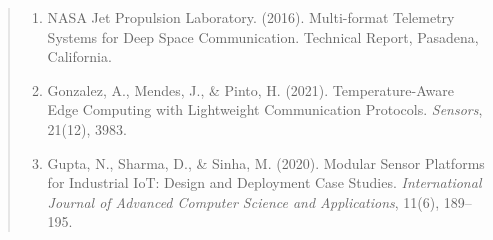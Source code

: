 \documentclass[12pt]{report}
\begin{document}
\begin{quote}
\begin{enumerate}
\item NASA Jet Propulsion Laboratory. (2016). Multi-format Telemetry Systems for Deep Space Communication. Technical Report, Pasadena, California.

\item Gonzalez, A., Mendes, J., \& Pinto, H. (2021). Temperature-Aware Edge Computing with Lightweight Communication Protocols. \textit{Sensors}, 21(12), 3983.

\item Gupta, N., Sharma, D., \& Sinha, M. (2020). Modular Sensor Platforms for Industrial IoT: Design and Deployment Case Studies. \textit{International Journal of Advanced Computer Science and Applications}, 11(6), 189–195.

\end{enumerate}

\end{quote}
\end{document}
